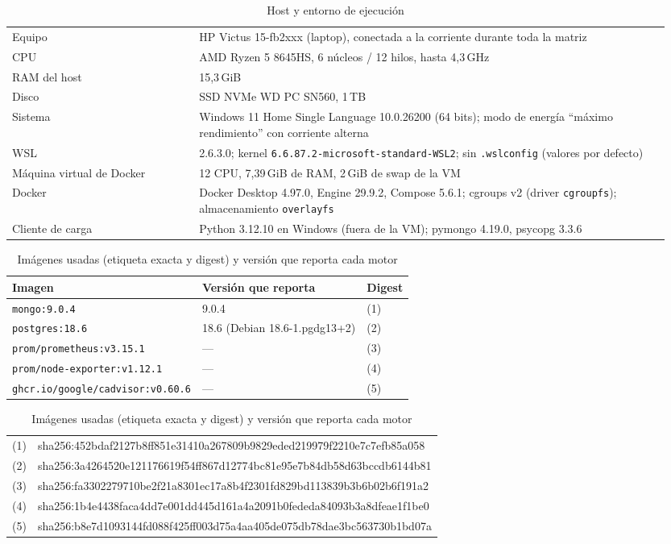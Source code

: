 \documentclass[11pt,a4paper]{article}
\newcommand{\cod}[1]{\texttt{#1}}
\begin{document}
\begin{table}[h]
\centering\small
\caption{Host y entorno de ejecución}\label{tab:host}
\begin{tabular}{@{}p{0.27\linewidth}p{0.68\linewidth}@{}}
\toprule
Equipo & HP Victus 15-fb2xxx (laptop), conectada a la corriente durante toda la matriz \\
CPU & AMD Ryzen 5 8645HS, 6 núcleos / 12 hilos, hasta 4,3\,GHz \\
RAM del host & 15,3\,GiB \\
Disco & SSD NVMe WD PC SN560, 1\,TB \\
Sistema & Windows 11 Home Single Language 10.0.26200 (64 bits); modo de energía
  ``máximo rendimiento'' con corriente alterna \\
WSL & 2.6.3.0; kernel \cod{6.6.87.2-microsoft-standard-WSL2}; sin \cod{.wslconfig}
  (valores por defecto) \\
Máquina virtual de Docker & 12 CPU, 7,39\,GiB de RAM, 2\,GiB de swap de la VM \\
Docker & Docker Desktop 4.97.0, Engine 29.9.2, Compose 5.6.1; cgroups v2 (driver
  \cod{cgroupfs}); almacenamiento \cod{overlayfs} \\
Cliente de carga & Python 3.12.10 en Windows (fuera de la VM); pymongo 4.19.0,
  psycopg 3.3.6 \\
\bottomrule
\end{tabular}
\end{table}

\begin{table}[h]
\centering\small
\caption{Imágenes usadas (etiqueta exacta y digest) y versión que reporta cada motor}\label{tab:imagenes}
\begin{tabular}{@{}lll@{}}
\toprule
Imagen & Versión que reporta & Digest \\
\midrule
\cod{mongo:9.0.4} & 9.0.4 & (1) \\
\cod{postgres:18.6} & 18.6 (Debian 18.6-1.pgdg13+2) & (2) \\
\cod{prom/prometheus:v3.15.1} & --- & (3) \\
\cod{prom/node-exporter:v1.12.1} & --- & (4) \\
\cod{ghcr.io/google/cadvisor:v0.60.6} & --- & (5) \\
\bottomrule
\end{tabular}

\smallskip
{\scriptsize\ttfamily
\begin{tabular}{@{}ll@{}}
(1) & sha256:452bdaf2127b8ff851e31410a267809b9829eded219979f2210e7c7efb85a058 \\
(2) & sha256:3a4264520e121176619f54ff867d12774bc81e95e7b84db58d63bccdb6144b81 \\
(3) & sha256:fa3302279710be2f21a8301ec17a8b4f2301fd829bd113839b3b6b02b6f191a2 \\
(4) & sha256:1b4e4438faca4dd7e001dd445d161a4a2091b0fededa84093b3a8dfeae1f1be0 \\
(5) & sha256:b8e7d1093144fd088f425ff003d75a4aa405de075db78dae3bc563730b1bd07a \\
\end{tabular}}
\end{table}
\end{document}

